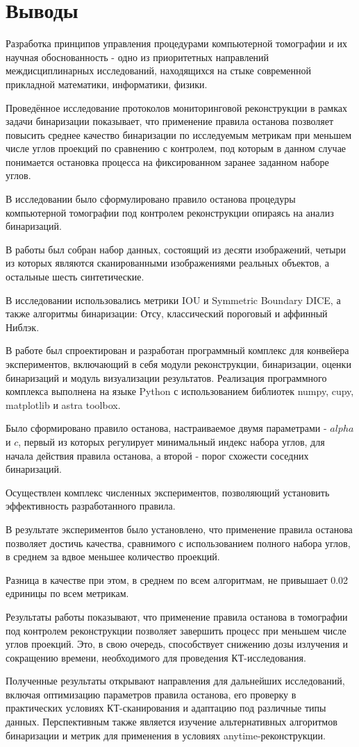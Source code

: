 \section{Выводы}

Разработка принципов управления процедурами компьютерной томографии и их научная обоснованность - одно из приоритетных направлений междисциплинарных исследований, находящихся на стыке современной прикладной математики, информатики, физики.  

Проведённое исследование протоколов мониторинговой реконструкции в рамках задачи бинаризации показывает, что применение правила останова позволяет повысить среднее качество бинаризации по исследуемым метрикам при меньшем числе углов проекций по сравнению с контролем, под которым в данном случае понимается остановка процесса на фиксированном заранее заданном наборе углов.~

В исследовании было сформулировано правило останова процедуры компьютерной томографии под контролем реконструкции опираясь на анализ бинаризаций. 

В работы был собран набор данных, состоящий из десяти изображений, четыри из которых являются сканированными изображениями реальных объектов, а остальные шесть синтетические.

В исследовании использовались метрики IOU и Symmetric Boundary DICE, а также алгоритмы бинаризации: Отсу, классический пороговый и аффинный Ниблэк.

В работе был спроектирован и разработан программный комплекс для конвейера экспериментов, включающий в себя модули реконструкции, бинаризации, оценки бинаризаций и модуль визуализации результатов. Реализация программного комплекса выполнена на языке Python с использованием библиотек numpy, cupy, matplotlib и astra toolbox.

Было сформировано правило останова, настраиваемое двумя параметрами - \(alpha\) и \(c\), первый из которых регулирует минимальный индекс набора углов, для начала действия правила останова, а второй - порог схожести соседних бинаризаций.

Осуществлен комплекс численных экспериментов, позволяющий установить эффективность разработанного правила.

В результате экспериментов было установлено, что применение правила останова позволяет достичь качества, сравнимого с использованием полного набора углов, в среднем за вдвое меньшее количество проекций.

Разница в качестве при этом, в среднем по всем алгоритмам, не привышает 0.02 едриницы по всем метрикам.

Результаты работы показывают, что применение правила останова в томографии под контролем реконструкции позволяет завершить процесс при меньшем числе углов проекций. Это, в свою очередь, способствует снижению дозы излучения и сокращению времени, необходимого для проведения КТ-исследования.

Полученные результаты открывают направления для дальнейших исследований, включая оптимизацию параметров правила останова, его проверку в практических условиях КТ-сканирования и адаптацию под различные типы данных. Перспективным также является изучение альтернативных алгоритмов бинаризации и метрик для применения в условиях anytime-реконструкции.